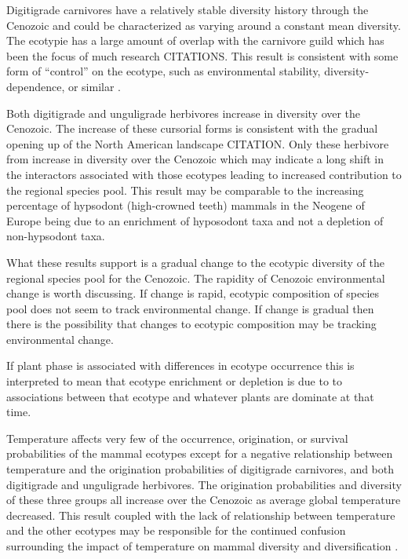 \documentclass[12pt,letterpaper]{article}
\begin{document}
Digitigrade carnivores have a relatively stable diversity history through the Cenozoic and could be characterized as varying around a constant mean diversity. The ecotypie has a large amount of overlap with the carnivore guild which has been the focus of much research CITATIONS. This result is consistent with some form of ``control'' on the ecotype, such as environmental stability, diversity-dependence, or similar \citet{Slater2015c,Silvestro2015b}.

Both digitigrade and unguligrade herbivores increase in diversity over the Cenozoic. The increase of these cursorial forms is consistent with the gradual opening up of the North American landscape CITATION. Only these herbivore from increase in diversity over the Cenozoic which may indicate a long shift in the interactors associated with those ecotypes leading to increased contribution to the regional species pool. This result may be comparable to the increasing percentage of hypsodont (high-crowned teeth) mammals in the Neogene of Europe being due to an enrichment of hyposodont taxa and not a depletion of non-hypsodont taxa.



What these results support is a gradual change to the ecotypic diversity of the regional species pool for the Cenozoic. The rapidity of Cenozoic environmental change is worth discussing. If change is rapid, ecotypic composition of species pool does not seem to track environmental change. If change is gradual then there is the possibility that changes to ecotypic composition may be tracking environmental change.

If plant phase is associated with differences in ecotype occurrence this is interpreted to mean that ecotype enrichment or depletion is due to to associations between that ecotype and whatever plants are dominate at that time.

Temperature affects very few of the occurrence, origination, or survival probabilities of the mammal ecotypes except for a negative relationship between temperature and the origination probabilities of digitigrade carnivores, and both digitigrade and unguligrade herbivores. The origination probabilities and diversity of these three groups all increase over the Cenozoic as average global temperature decreased. This result coupled with the lack of relationship between temperature and the other ecotypes may be responsible for the continued confusion surrounding the impact of temperature on mammal diversity and diversification \citep{Alroy1996a,Alroy2000g,Figueirido2012,Janis1993c,Blois2009}.
\end{document}
